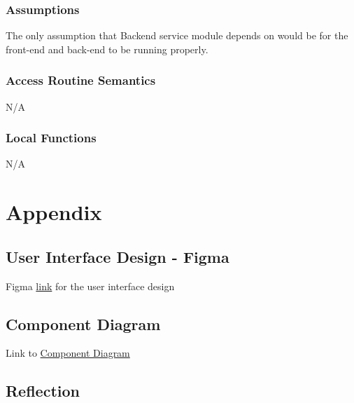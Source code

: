 \documentclass[12pt, titlepage]{article}
\begin{document}
\subsubsection{Assumptions}

The only assumption that Backend service module depends on would be for the front-end and back-end to be running properly. 

\subsubsection{Access Routine Semantics}

N/A

\subsubsection{Local Functions}

N/A

\newpage

\section{Appendix} \label{Appendix}

\subsection{User Interface Design - Figma}

Figma \href{https://www.figma.com/file/i2Q2VBK5So9Fr4Y0fTfo8U/MCT-Design?type=design&node-id=0%3A1&mode=design&t=luirTXz6ZzzY3WR5-1}{link} for the user interface design

\subsection{Component Diagram}

Link to \href{https://drive.google.com/file/d/1Ch1y_K63j26DbXrvBAeoG4raAhQos55k/view?usp=drive_link}{Component Diagram}

\subsection{Reflection}
\end{document}
